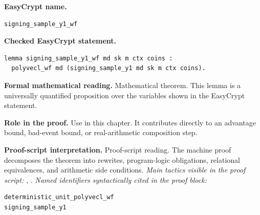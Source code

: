 \begin{formaltheorem}
\noindent\textbf{EasyCrypt name.}
\begin{lstlisting}[language=EasyCrypt,basicstyle=\ttfamily\scriptsize]
signing_sample_y1_wf
\end{lstlisting}
\noindent\textbf{Checked EasyCrypt statement.}
\begin{lstlisting}[language=EasyCrypt,basicstyle=\ttfamily\scriptsize]
lemma signing_sample_y1_wf md sk m ctx coins :
  polyvecl_wf md (signing_sample_y1 md sk m ctx coins).
\end{lstlisting}
\noindent\textbf{Formal mathematical reading.}
Mathematical theorem. This lemma is a universally quantified proposition over the variables shown in the EasyCrypt statement.

\noindent\textbf{Role in the proof.}
Use in this chapter. It contributes directly to an advantage bound, bad-event bound, or real-arithmetic composition step.

\noindent\textbf{Proof-script interpretation.}
Proof-script reading. The machine proof decomposes the theorem into rewrites, program-logic obligations, relational equivalences, and arithmetic side conditions.
\emph{Main tactics visible in the proof script:} , .
\emph{Named identifiers syntactically cited in the proof block:}
\begin{lstlisting}[language=EasyCrypt,basicstyle=\ttfamily\scriptsize]
deterministic_unit_polyvecl_wf
signing_sample_y1
\end{lstlisting}

\end{formaltheorem}

